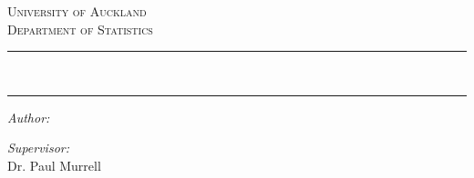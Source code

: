 \begin{titlepage}
\begin{center}

\vspace*{2.5cm}



\vspace{1cm}

\textsc{\LARGE University of Auckland} \\[0.4cm]
\textsc{\Large Department of Statistics} \\[1cm]

\hrule
\vspace{0.1cm} %
{\Large \doctitle{}} \\[0.5cm]
\hrule
\vspace{0.5cm}

\begin{minipage}{0.4\textwidth}
\begin{flushleft} \large
\emph{Author:}\\
\docauthor{}
\end{flushleft}
\end{minipage}
\begin{minipage}{0.4\textwidth}
\begin{flushright} \large
\emph{Supervisor:} \\
Dr. Paul Murrell
\end{flushright}
\end{minipage}

\vfill

{\large \docdate{}}

\end{center}
\end{titlepage}
